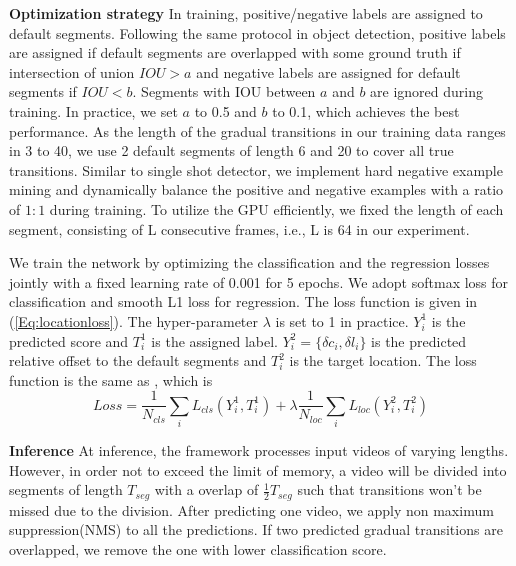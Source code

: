 \documentclass[runningheads]{llncs}
\begin{document}
\textbf{Optimization strategy} In training, positive/negative labels are assigned to default segments. Following the same protocol in object detection, positive labels are assigned if default segments are overlapped with some ground truth if intersection of union \(IOU>a\) and negative labels are assigned for default segments if \(IOU<b\). Segments with IOU between \(a\) and \(b\) are ignored during training. In practice, we set \(a\) to 0.5  and \(b\) to 0.1, which achieves the best performance. As the length of the gradual transitions in our training data ranges in 3 to 40, we use 2 default segments of length 6 and 20 to cover all true transitions. Similar to single shot detector, we implement hard negative example mining and dynamically balance the positive and negative examples with a ratio of \(1:1\) during training. To utilize the GPU efficiently, we fixed the length of each segment, consisting of L consecutive frames, i.e., L is 64 in our experiment.

We train the network by optimizing the classification and the regression losses jointly with a fixed learning rate of 0.001 for 5 epochs. We adopt softmax loss for classification and smooth L1 loss for regression. The loss function is given in (\ref{Eq:locationloss}). The hyper-parameter \(\lambda\) is set to 1 in practice. \(Y_i^1\) is the predicted score and \(T_i^1\) is the assigned label. \(Y_i^2 =\{ \delta c_i ,\delta l_i\}\) is the predicted relative offset to the default segments and \(T_i^2\) is the target location. The loss function is the same as \cite{liu2016ssd}, which is
\begin{equation}\label{Eq:locationloss}
Loss=\frac{1}{N_{cls}} \sum_{i} L_{cls}(Y_i^1,T_i^1)+\lambda \frac{1}{N_{loc}} \sum_{i} L_{loc}(Y_i^2,T_i^2)
\end{equation}

\textbf{Inference} At inference, the framework processes input videos of varying lengths. However, in order not to exceed the limit of memory, a video will be divided into segments of length \(T_{seg}\) with a overlap of \(\frac{1}{2}T_{seg}\) such that transitions won't be missed due to the division. After predicting one video, we apply non maximum suppression(NMS) to all the predictions. If two predicted gradual transitions are overlapped, we remove the one with lower classification score.
\end{document}

